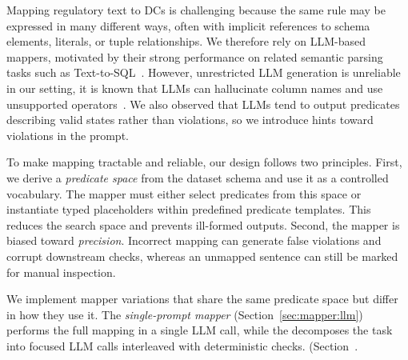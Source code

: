 Mapping regulatory text to DCs is challenging because the same rule may be expressed in many different ways, often with implicit references to schema elements, literals, or tuple relationships. 
We therefore rely on LLM-based mappers, motivated by their strong performance on related semantic parsing tasks such as Text-to-SQL~\cite{llmTEXT2SQLSurvey2025}. However, unrestricted LLM generation is unreliable in our setting, it is known that LLMs  can hallucinate column names and use unsupported operators~\cite{dail2025,llmTEXT2SQLSurvey2025,DBLP:conf/dexa/DociniAO25}. 
We also observed that LLMs tend to output predicates describing valid states rather than violations, so we introduce hints toward violations in the prompt.

To make mapping tractable and reliable, our design follows two principles. First, we derive a \emph{predicate space} from the dataset schema and use it as a controlled vocabulary. The mapper must either select predicates from this space or instantiate typed placeholders within predefined predicate templates. This reduces the search space and prevents ill-formed outputs. Second, the mapper is biased toward \emph{precision}. Incorrect mapping can generate false violations and corrupt downstream checks, whereas an unmapped sentence can still be marked for manual inspection.

We implement \DIFdelbegin {}\DIFdelend \DIFaddbegin {}\DIFaddend mapper variations that share the same predicate space but differ in how they use it. The \emph{single-prompt mapper} (Section~\ref{sec:mapper:llm}) \DIFdelbegin {}\emph{} %
\DIFdelend performs the full mapping in a single LLM call, while the \DIFdelbegin {}\DIFdelend \DIFaddbegin \emph{} \DIFaddend decomposes the task into focused LLM calls interleaved with deterministic checks. \DIFdelbegin {}\emph{} %
\DIFdelend \DIFaddbegin {}\DIFaddend (Section~\DIFdelbegin {}\DIFdelend \DIFaddbegin \DIFadd{\ref{sec:mapper:sql})}\DIFaddend .


